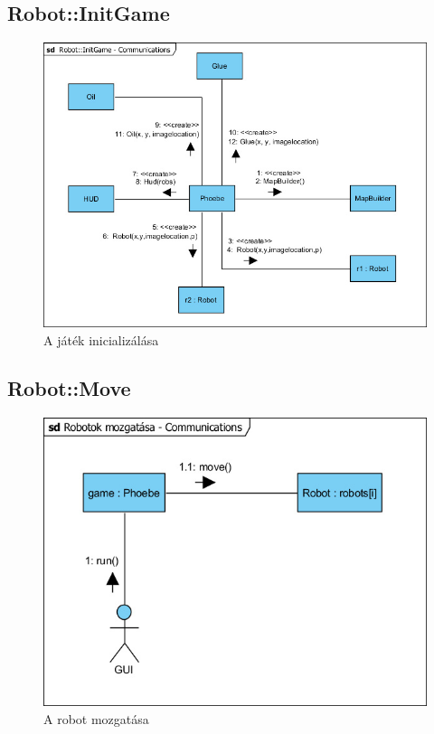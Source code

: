 \subsection{Robot::InitGame}
\begin{figure}[h]
\begin{center}
\includegraphics[width=17cm]{images/Commdiagrams/Comm_InitGame.jpg}
\caption{A játék inicializálása}
\label{fig:example7}
\end{center}
\end{figure}
\pagebreak

\subsection{Robot::Move}
\begin{figure}[h]
\begin{center}
\includegraphics[width=17cm]{images/Commdiagrams/Comm_RobotMove.jpg}
\caption{A robot mozgatása}
\label{fig:example8}
\end{center}
\end{figure}
\pagebreak


